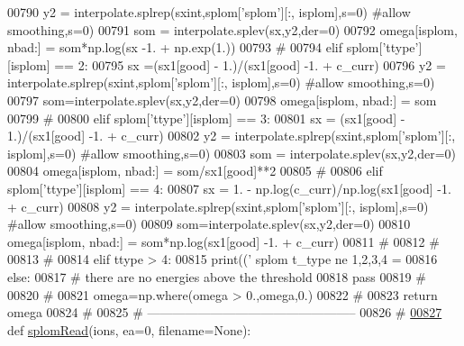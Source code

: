 \begin{DoxyCode}
{{{{{{{{{{{00790                 y2 = interpolate.splrep(sxint,splom[\textcolor{stringliteral}{'splom'}][:, isplom],s=0)  \textcolor{comment}{#allow smoothing,s=0)}
00791                 som = interpolate.splev(sx,y2,der=0)
00792                 omega[isplom, nbad:] = som*np.log(sx -1. + np.exp(1.))
00793             \textcolor{comment}{#}
00794             \textcolor{keywordflow}{elif} splom[\textcolor{stringliteral}{'ttype'}][isplom] == 2:
00795                 sx =(sx1[good] - 1.)/(sx1[good] -1. + c\_curr)
00796                 y2 = interpolate.splrep(sxint,splom[\textcolor{stringliteral}{'splom'}][:, isplom],s=0)  \textcolor{comment}{#allow smoothing,s=0)}
00797                 som=interpolate.splev(sx,y2,der=0)
00798                 omega[isplom, nbad:] = som
00799             \textcolor{comment}{#}
00800             \textcolor{keywordflow}{elif} splom[\textcolor{stringliteral}{'ttype'}][isplom] == 3:
00801                 sx = (sx1[good] - 1.)/(sx1[good] -1. + c\_curr)
00802                 y2 = interpolate.splrep(sxint,splom[\textcolor{stringliteral}{'splom'}][:, isplom],s=0)  \textcolor{comment}{#allow smoothing,s=0)}
00803                 som = interpolate.splev(sx,y2,der=0)
00804                 omega[isplom, nbad:] = som/sx1[good]**2
00805             \textcolor{comment}{#}
00806             \textcolor{keywordflow}{elif} splom[\textcolor{stringliteral}{'ttype'}][isplom] == 4:
00807                 sx = 1. - np.log(c\_curr)/np.log(sx1[good] -1. + c\_curr)
00808                 y2 = interpolate.splrep(sxint,splom[\textcolor{stringliteral}{'splom'}][:, isplom],s=0)  \textcolor{comment}{#allow smoothing,s=0)}
00809                 som=interpolate.splev(sx,y2,der=0)
00810                 omega[isplom, nbad:] = som*np.log(sx1[good] -1. + c\_curr)
00811             \textcolor{comment}{#}
00812             \textcolor{comment}{#}
00813             \textcolor{comment}{#}
00814             \textcolor{keywordflow}{elif} ttype > 4:
00815                 print((\textcolor{stringliteral}{' splom t\_type ne 1,2,3,4 = %
00816         \textcolor{keywordflow}{else}:
00817             \textcolor{comment}{# there are no energies above the threshold}
00818             \textcolor{keywordflow}{pass}
00819     \textcolor{comment}{#}
00820     \textcolor{comment}{#}
00821     omega=np.where(omega > 0.,omega,0.)
00822     \textcolor{comment}{#}
00823     \textcolor{keywordflow}{return} omega
00824     \textcolor{comment}{#}
00825     \textcolor{comment}{# --------------------------------------------------}
00826     \textcolor{comment}{#}
\hypertarget{__chianti__tools_8py_source_l00827}{}\hyperlink{namespacepyneb_1_1utils_1_1__chianti__tools_a8013cd9bdbf2f8ec5a5ac06e25b0e3a4}{00827} \textcolor{keyword}{def }\hyperlink{namespacepyneb_1_1utils_1_1__chianti__tools_a8013cd9bdbf2f8ec5a5ac06e25b0e3a4}{splomRead}(ions, ea=0, filename=None):
}}}}}}}}}}}}
\end{DoxyCode}
